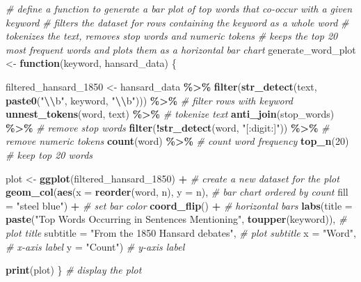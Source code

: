 \documentclass[
]{article}
\newenvironment{Shaded}{\begin{snugshade}}{\end{snugshade}}
\newcommand{\AttributeTok}[1]{\textcolor[rgb]{0.13,0.29,0.53}{#1}}
\newcommand{\CommentTok}[1]{\textcolor[rgb]{0.56,0.35,0.01}{\textit{#1}}}
\newcommand{\ControlFlowTok}[1]{\textcolor[rgb]{0.13,0.29,0.53}{\textbf{#1}}}
\newcommand{\DecValTok}[1]{\textcolor[rgb]{0.00,0.00,0.81}{#1}}
\newcommand{\FunctionTok}[1]{\textcolor[rgb]{0.13,0.29,0.53}{\textbf{#1}}}
\newcommand{\NormalTok}[1]{#1}
\newcommand{\OtherTok}[1]{\textcolor[rgb]{0.56,0.35,0.01}{#1}}
\newcommand{\SpecialCharTok}[1]{\textcolor[rgb]{0.81,0.36,0.00}{\textbf{#1}}}
\newcommand{\StringTok}[1]{\textcolor[rgb]{0.31,0.60,0.02}{#1}}
\begin{document}
\begin{Shaded}
\begin{Highlighting}[]
\CommentTok{\# define a function to generate a bar plot of top words that co{-}occur with a given keyword}
\CommentTok{\# filters the dataset for rows containing the keyword as a whole word}
\CommentTok{\# tokenizes the text, removes stop words and numeric tokens}
\CommentTok{\# keeps the top 20 most frequent words and plots them as a horizontal bar chart}
\NormalTok{generate\_word\_plot }\OtherTok{\textless{}{-}} \ControlFlowTok{function}\NormalTok{(keyword, hansard\_data) \{}
    
\NormalTok{    filtered\_hansard\_1850 }\OtherTok{\textless{}{-}}\NormalTok{ hansard\_data }\SpecialCharTok{\%\textgreater{}\%}
      \FunctionTok{filter}\NormalTok{(}\FunctionTok{str\_detect}\NormalTok{(text, }\FunctionTok{paste0}\NormalTok{(}\StringTok{"}\SpecialCharTok{\textbackslash{}\textbackslash{}}\StringTok{b"}\NormalTok{, keyword, }\StringTok{"}\SpecialCharTok{\textbackslash{}\textbackslash{}}\StringTok{b"}\NormalTok{))) }\SpecialCharTok{\%\textgreater{}\%} \CommentTok{\# filter rows with keyword}
      \FunctionTok{unnest\_tokens}\NormalTok{(word, text) }\SpecialCharTok{\%\textgreater{}\%} \CommentTok{\# tokenize text}
      \FunctionTok{anti\_join}\NormalTok{(stop\_words) }\SpecialCharTok{\%\textgreater{}\%} \CommentTok{\# remove stop words}
      \FunctionTok{filter}\NormalTok{(}\SpecialCharTok{!}\FunctionTok{str\_detect}\NormalTok{(word, }\StringTok{"[:digit:]"}\NormalTok{)) }\SpecialCharTok{\%\textgreater{}\%} \CommentTok{\# remove numeric tokens}
      \FunctionTok{count}\NormalTok{(word) }\SpecialCharTok{\%\textgreater{}\%} \CommentTok{\# count word frequency}
      \FunctionTok{top\_n}\NormalTok{(}\DecValTok{20}\NormalTok{) }\CommentTok{\# keep top 20 words}
    
\NormalTok{    plot }\OtherTok{\textless{}{-}} \FunctionTok{ggplot}\NormalTok{(filtered\_hansard\_1850) }\SpecialCharTok{+} \CommentTok{\# create a new dataset for the plot                       }
      \FunctionTok{geom\_col}\NormalTok{(}\FunctionTok{aes}\NormalTok{(}\AttributeTok{x =} \FunctionTok{reorder}\NormalTok{(word, n), }\AttributeTok{y =}\NormalTok{ n), }\CommentTok{\# bar chart ordered by count}
               \AttributeTok{fill =} \StringTok{"steel blue"}\NormalTok{) }\SpecialCharTok{+} \CommentTok{\# set bar color}
      \FunctionTok{coord\_flip}\NormalTok{() }\SpecialCharTok{+} \CommentTok{\# horizontal bars}
      \FunctionTok{labs}\NormalTok{(}\AttributeTok{title =} \FunctionTok{paste}\NormalTok{(}\StringTok{"Top Words Occurring in Sentences Mentioning"}\NormalTok{, }
                         \FunctionTok{toupper}\NormalTok{(keyword)), }\CommentTok{\# plot title}
           \AttributeTok{subtitle =} \StringTok{"From the 1850 Hansard debates"}\NormalTok{, }\CommentTok{\# plot subtitle}
           \AttributeTok{x =} \StringTok{"Word"}\NormalTok{, }\CommentTok{\# x{-}axis label}
           \AttributeTok{y =} \StringTok{"Count"}\NormalTok{) }\CommentTok{\# y{-}axis label}
    
    \FunctionTok{print}\NormalTok{(plot) \} }\CommentTok{\# display the plot}
\end{Highlighting}
\end{Shaded}
\end{document}
